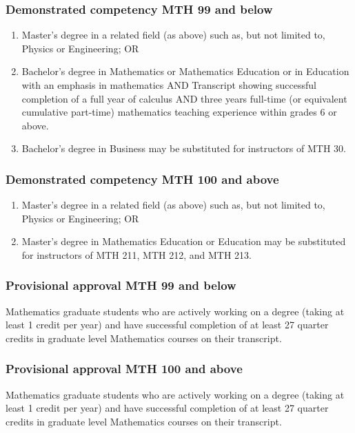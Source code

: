 \subsubsection{Demonstrated competency MTH 99 and below}
\begin{enumerate}
  \item Master's degree in a related field (as above) such as, but not limited to, Physics or Engineering; OR
  \item Bachelor's degree in Mathematics or Mathematics Education or in Education with an emphasis in mathematics AND Transcript showing successful completion of a full year of calculus AND three years full-time (or equivalent cumulative part-time) mathematics teaching experience within grades 6 or above.  
  \item Bachelor's degree in Business may be substituted for instructors of MTH 30.
\end{enumerate}
\subsubsection{Demonstrated competency MTH 100 and above}
\begin{enumerate}
  \item Master's degree in a related field (as above) such as, but not limited to, Physics or Engineering; OR
  \item Master's degree in Mathematics Education or Education may be substituted for instructors of MTH 211, MTH 212, and MTH 213.
\end{enumerate}
\subsubsection{Provisional approval MTH 99 and below}
Mathematics graduate students who are actively working on a degree (taking at least 1 credit per year) and have successful completion of at least 27 quarter credits in graduate level Mathematics courses on their transcript.
\subsubsection{Provisional approval MTH 100 and above}
Mathematics graduate students who are actively working on a degree (taking at least 1 credit per year) and have successful completion of at least 27 quarter credits in graduate level Mathematics courses on their transcript.

